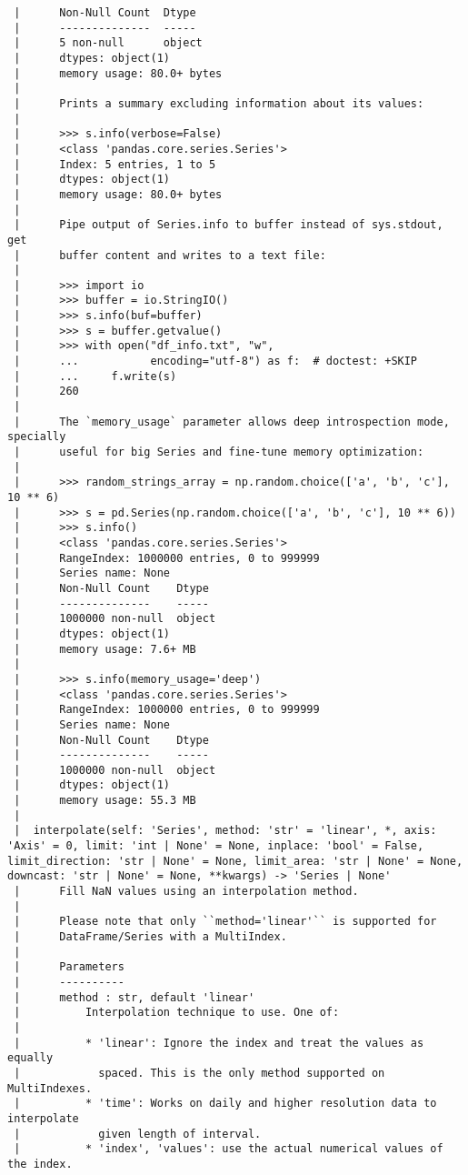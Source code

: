 \documentclass[
  letterpaper,
  DIV=11,
  numbers=noendperiod]{scrreprt}
\begin{document}
\begin{verbatim}
 |      Non-Null Count  Dtype
 |      --------------  -----
 |      5 non-null      object
 |      dtypes: object(1)
 |      memory usage: 80.0+ bytes
 |      
 |      Prints a summary excluding information about its values:
 |      
 |      >>> s.info(verbose=False)
 |      <class 'pandas.core.series.Series'>
 |      Index: 5 entries, 1 to 5
 |      dtypes: object(1)
 |      memory usage: 80.0+ bytes
 |      
 |      Pipe output of Series.info to buffer instead of sys.stdout, get
 |      buffer content and writes to a text file:
 |      
 |      >>> import io
 |      >>> buffer = io.StringIO()
 |      >>> s.info(buf=buffer)
 |      >>> s = buffer.getvalue()
 |      >>> with open("df_info.txt", "w",
 |      ...           encoding="utf-8") as f:  # doctest: +SKIP
 |      ...     f.write(s)
 |      260
 |      
 |      The `memory_usage` parameter allows deep introspection mode, specially
 |      useful for big Series and fine-tune memory optimization:
 |      
 |      >>> random_strings_array = np.random.choice(['a', 'b', 'c'], 10 ** 6)
 |      >>> s = pd.Series(np.random.choice(['a', 'b', 'c'], 10 ** 6))
 |      >>> s.info()
 |      <class 'pandas.core.series.Series'>
 |      RangeIndex: 1000000 entries, 0 to 999999
 |      Series name: None
 |      Non-Null Count    Dtype
 |      --------------    -----
 |      1000000 non-null  object
 |      dtypes: object(1)
 |      memory usage: 7.6+ MB
 |      
 |      >>> s.info(memory_usage='deep')
 |      <class 'pandas.core.series.Series'>
 |      RangeIndex: 1000000 entries, 0 to 999999
 |      Series name: None
 |      Non-Null Count    Dtype
 |      --------------    -----
 |      1000000 non-null  object
 |      dtypes: object(1)
 |      memory usage: 55.3 MB
 |  
 |  interpolate(self: 'Series', method: 'str' = 'linear', *, axis: 'Axis' = 0, limit: 'int | None' = None, inplace: 'bool' = False, limit_direction: 'str | None' = None, limit_area: 'str | None' = None, downcast: 'str | None' = None, **kwargs) -> 'Series | None'
 |      Fill NaN values using an interpolation method.
 |      
 |      Please note that only ``method='linear'`` is supported for
 |      DataFrame/Series with a MultiIndex.
 |      
 |      Parameters
 |      ----------
 |      method : str, default 'linear'
 |          Interpolation technique to use. One of:
 |      
 |          * 'linear': Ignore the index and treat the values as equally
 |            spaced. This is the only method supported on MultiIndexes.
 |          * 'time': Works on daily and higher resolution data to interpolate
 |            given length of interval.
 |          * 'index', 'values': use the actual numerical values of the index.

\end{verbatim}
\end{document}
